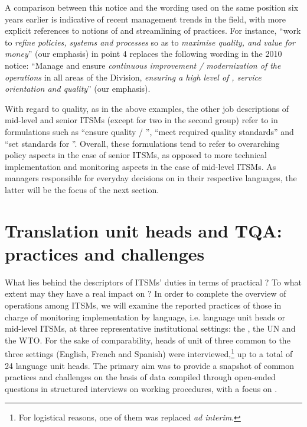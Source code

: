 \documentclass[output=paper]{langsci/langscibook}
\begin{document}
A comparison between this notice and the wording used on the same position six years earlier is indicative of recent management trends in the field, with more explicit references to notions of  and streamlining of practices. For instance, “work to \textit{refine policies, systems and processes} so as to \textit{maximise quality,  and value for money}” (our emphasis) in point 4 replaces the following wording in the 2010 notice: “Manage and ensure \textit{continuous improvement / modernization of the operations} in all areas of the Division, \textit{ensuring a high level of , service orientation and quality}” (our emphasis).



With regard to quality, as in the above examples, the other job descriptions of mid-level and senior ITSMs (except for two in the second group) refer to  in formulations such as “ensure quality / ”, “meet required quality standards” and “set standards for ”. Overall, these formulations tend to refer to overarching policy aspects in the case of senior ITSMs, as opposed to more technical implementation and monitoring aspects in the case of mid-level ITSMs. As managers responsible for everyday decisions on  in their respective languages, the latter will be the focus of the next section. 



\section{Translation unit heads and TQA: practices and challenges}\label{sec:prietoramos:3}



What lies behind the descriptors of ITSMs’ duties in terms of practical ? To what extent may they have a real impact on ? In order to complete the overview of  operations among ITSMs, we will examine the reported practices of those in charge of monitoring  implementation by language, i.e. language unit heads or mid-level ITSMs, at three representative institutional settings: the , the UN and the WTO. For the sake of comparability, heads of unit of three  common to the three settings (English, French and Spanish) were interviewed,\footnote{For logistical reasons, one of them was replaced \textit{ad interim}.} up to a total of 24 language unit heads. The primary aim was to provide a snapshot of common practices and challenges on the basis of data compiled through open-ended questions in structured interviews on working procedures, with a focus on .
\end{document}
